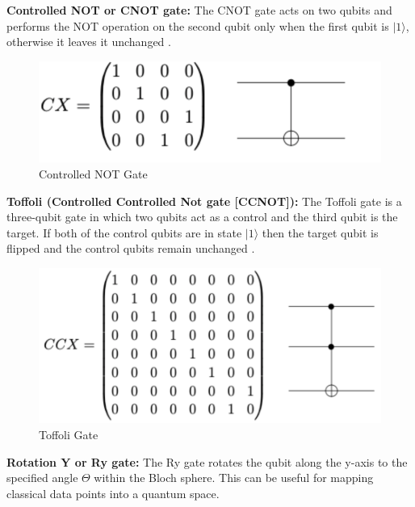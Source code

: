 \textbf{Controlled NOT or CNOT gate:} The CNOT gate acts on two qubits and performs the NOT operation on the second qubit only when the first qubit is $\vert1\rangle $, otherwise it leaves it unchanged \citep{wikiVec}. 

\begin{figure}[h!]
      \centering
      \includegraphics[scale=0.6]{background/CNOTGate.png}
      \caption{Controlled NOT Gate
      \citep{Khan2019}}
      \label{CNotGa}
\end{figure}

\vspace{0.5cm}

\textbf{Toffoli (Controlled Controlled Not gate [CCNOT]):} The Toffoli gate is a three-qubit gate in which two qubits act as a control and the third qubit is the target. If both of the control qubits are in state $\vert1\rangle $ then the target qubit is flipped and the control qubits remain unchanged \citep{Khan2019}.

\begin{figure}[h!]
      \centering
      \includegraphics[scale=0.6]{background/TGate.png}
      \caption{Toffoli Gate
      \citep{Khan2019}}
      \label{ToGa}
\end{figure}

\textbf{Rotation Y or Ry gate:}
The Ry gate rotates the qubit along the y-axis to the specified angle $\Theta$ within the Bloch sphere. This can be useful for mapping classical data points into a quantum space\vspace{0.8cm}.


